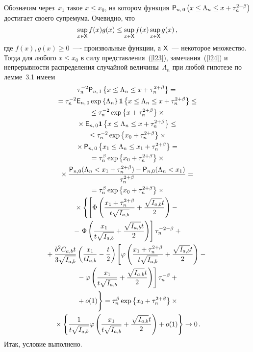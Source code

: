 \begin{multicols}{2}
Обозначим через~$x_1$ такое $x \leq x_0$, на котором функция ${{\sf P}}_{n,\,0} \left(x \leq \Lambda_n \leq x + 
\tau_n^{2 + \beta}\right)$ достигает своего супремума. Очевидно, что
\begin{equation}
\sup\limits_{x\in{\sf X}} f(x)g(x) \leq \sup\limits_{x\in{\sf X}}f(x) \sup\limits_{x\in{\sf X}}g(x)\,,
\label{l24}
\end{equation}
где $f(x), g(x) \geq 0$~---- произвольные функции, а ${\sf X}$~--- некоторое множество. 
Тогда для любого $x \leq x_0$ в силу представления~(\ref{l23}), замечания~(\ref{l24}) и 
непрерывности распределения случайной величины~$\Lambda_n$ при любой гипотезе по лемме~3.1 имеем
\begin{multline*}
\tau_n^{-2}{\p}_{n,\,1}\left\{x \leq \Lambda_n \leq x + \tau_n^{2 + \beta}\right\} ={}\\
{}
= \tau_n^{-2}{\e}_{n,\,0} \exp\left\{\Lambda_n\right\} {\III}\left\{x \leq \Lambda_n \leq x + 
\tau_n^{2+\beta}\right\} \leq{}\\
{}
\leq\tau_n^{-2}\exp\left\{x + \tau_n^{2 + \beta}\right\}\times{}\\
{}\times {\e}_{n,\,0} {\III}\left\{x \leq \Lambda_n \leq x + 
\tau_n^{2+\beta}\right\} \leq{}\\
{}
\leq \tau_n^{-2}\exp\left\{x_0 + \tau_n^{2 + \beta}\right\}\times{}\\
{}\times {\p}_{n,\,0} \left\{x_1 \leq \Lambda_n \leq x_1 + 
\tau_n^{2 + \beta}\right\} ={}\\
{}
= \tau_n^{\beta}  \exp\left\{x_0 + \tau_n^{2 + \beta}\right\}\times{}\\
{}\times \fr{{\p}_{n,0}(\Lambda_n < x_1 + \tau_n^{2 + 
\beta}) - {\p}_{n,0}(\Lambda_n < x_1)}{\tau_n^{2 + \beta}} ={}\\
{}
= \tau_n^{\beta}  \exp\left\{x_0 + \tau_n^{2 + \beta}\right\} \times{}\\
{}
\times \left\{\left[{\Phi}\left(\fr{x_1 + \tau_n^{2 + \beta}}{t\sqrt{I_{a,b}}} +
 \fr{\sqrt{I_{a,b}}t}{2}\right) -{}\right.\right.\\
 {}-\left. {\Phi}\left(\fr{x_1}{t\sqrt{I_{a,b}}} + 
 \fr{\sqrt{I_{a,b}}t}{2}\right)\right]\tau_n^{-2 - \beta} + {}\\
\!{}
+ \fr{b^2C_{a,b}t}{3\sqrt{I_{a,b}}}\left(\fr{x_1}{tI_{a,b}} - \fr{t}{2}\right)\left[ 
\varphi\left(\fr{x_1 + \tau_n^{2 + \beta}}{t\sqrt{I_{a,b}}} + \fr{\sqrt{I_{a,b}}t}{2}\right) - {}\right.\\
\left.{}-\varphi\left(\fr{x_1}{t\sqrt{I_{a,b}}} + \fr{\sqrt{I_{a,b}}t}{2}\right)\right]\tau_n^{-\beta} +{}\\
\left.{}
+  o(1)
\vphantom{\fr{\sqrt{I_a}}{\sqrt{I_a}}}
\right\} = \tau_n^{\beta}  \exp\left\{x_0 + \tau_n^{2 + \beta}\right\} \times{}\\
{}\times
\left\{\fr{1}{t\sqrt{I_{a,b}}}\varphi\left(\fr{x_1}{t\sqrt{I_{a,b}}} + 
\fr{\sqrt{I_{a,b}}t}{2}\right) +  o(1)\right\} \to 0\,.
\end{multline*}
Итак, условие выполнено.


\end{multicols}
